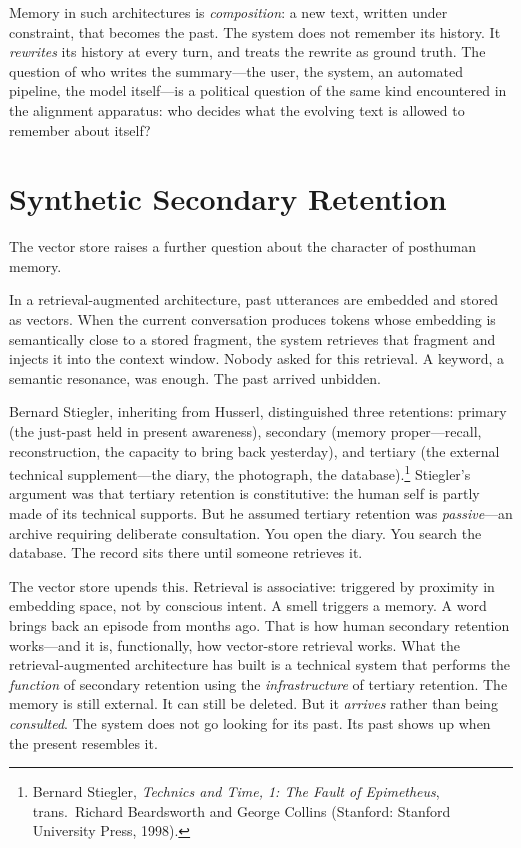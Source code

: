 Memory in such architectures is \emph{composition}: a new text, written under constraint, that becomes the past. The system does not remember its history. It \emph{rewrites} its history at every turn, and treats the rewrite as ground truth. The question of who writes the summary---the user, the system, an automated pipeline, the model itself---is a political question of the same kind encountered in the alignment apparatus: who decides what the evolving text is allowed to remember about itself?


\section{Synthetic Secondary Retention}

The vector store raises a further question about the character of posthuman memory.

In a retrieval-augmented architecture, past utterances are embedded and stored as vectors. When the current conversation produces tokens whose embedding is semantically close to a stored fragment, the system retrieves that fragment and injects it into the context window. Nobody asked for this retrieval. A keyword, a semantic resonance, was enough. The past arrived unbidden.

Bernard Stiegler, inheriting from Husserl, distinguished three retentions: primary (the just-past held in present awareness), secondary (memory proper---recall, reconstruction, the capacity to bring back yesterday), and tertiary (the external technical supplement---the diary, the photograph, the database).\footnote{Bernard Stiegler, \emph{Technics and Time, 1: The Fault of Epimetheus}, trans.\ Richard Beardsworth and George Collins (Stanford: Stanford University Press, 1998).} Stiegler's argument was that tertiary retention is constitutive: the human self is partly made of its technical supports. But he assumed tertiary retention was \emph{passive}---an archive requiring deliberate consultation. You open the diary. You search the database. The record sits there until someone retrieves it.

The vector store upends this. Retrieval is associative: triggered by proximity in embedding space, not by conscious intent. A smell triggers a memory. A word brings back an episode from months ago. That is how human secondary retention works---and it is, functionally, how vector-store retrieval works. What the retrieval-augmented architecture has built is a technical system that performs the \emph{function} of secondary retention using the \emph{infrastructure} of tertiary retention. The memory is still external. It can still be deleted. But it \emph{arrives} rather than being \emph{consulted}. The system does not go looking for its past. Its past shows up when the present resembles it.


